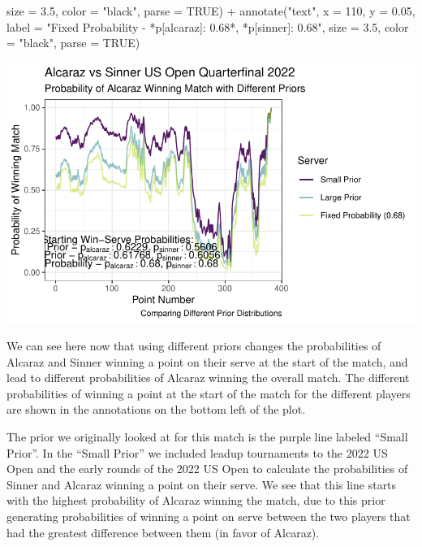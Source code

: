 \documentclass[
  letterpaper,
  DIV=11,
  numbers=noendperiod]{scrartcl}
\newenvironment{Shaded}{\begin{snugshade}}{\end{snugshade}}
\newcommand{\AttributeTok}[1]{\textcolor[rgb]{0.40,0.45,0.13}{#1}}
\newcommand{\ConstantTok}[1]{\textcolor[rgb]{0.56,0.35,0.01}{#1}}
\newcommand{\DecValTok}[1]{\textcolor[rgb]{0.68,0.00,0.00}{#1}}
\newcommand{\FloatTok}[1]{\textcolor[rgb]{0.68,0.00,0.00}{#1}}
\newcommand{\FunctionTok}[1]{\textcolor[rgb]{0.28,0.35,0.67}{#1}}
\newcommand{\NormalTok}[1]{\textcolor[rgb]{0.00,0.23,0.31}{#1}}
\newcommand{\SpecialCharTok}[1]{\textcolor[rgb]{0.37,0.37,0.37}{#1}}
\newcommand{\StringTok}[1]{\textcolor[rgb]{0.13,0.47,0.30}{#1}}
\begin{document}
\begin{Shaded}
\begin{Highlighting}[]
           \AttributeTok{size =} \FloatTok{3.5}\NormalTok{, }\AttributeTok{color =} \StringTok{"black"}\NormalTok{, }\AttributeTok{parse =} \ConstantTok{TRUE}\NormalTok{) }\SpecialCharTok{+}
  \FunctionTok{annotate}\NormalTok{(}\StringTok{"text"}\NormalTok{, }\AttributeTok{x =} \DecValTok{110}\NormalTok{, }\AttributeTok{y =} \FloatTok{0.05}\NormalTok{, }
           \AttributeTok{label =} \StringTok{"\textquotesingle{}Fixed Probability {-} \textquotesingle{}*p[alcaraz]: 0.68*\textquotesingle{}, \textquotesingle{}*p[sinner]: 0.68"}\NormalTok{, }
           \AttributeTok{size =} \FloatTok{3.5}\NormalTok{, }\AttributeTok{color =} \StringTok{"black"}\NormalTok{, }\AttributeTok{parse =} \ConstantTok{TRUE}\NormalTok{)}
\end{Highlighting}
\end{Shaded}

\includegraphics{Project_Write_Up_files/figure-pdf/unnamed-chunk-27-1.pdf}

\linespread{2}

We can see here now that using different priors changes the
probabilities of Alcaraz and Sinner winning a point on their serve at
the start of the match, and lead to different probabilities of Alcaraz
winning the overall match. The different probabilities of winning a
point at the start of the match for the different players are shown in
the annotations on the bottom left of the plot.

The prior we originally looked at for this match is the purple line
labeled ``Small Prior''. In the ``Small Prior'' we included leadup
tournaments to the 2022 US Open and the early rounds of the 2022 US Open
to calculate the probabilities of Sinner and Alcaraz winning a point on
their serve. We see that this line starts with the highest probability
of Alcaraz winning the match, due to this prior generating probabilities
of winning a point on serve between the two players that had the
greatest difference between them (in favor of Alcaraz).
\end{document}
